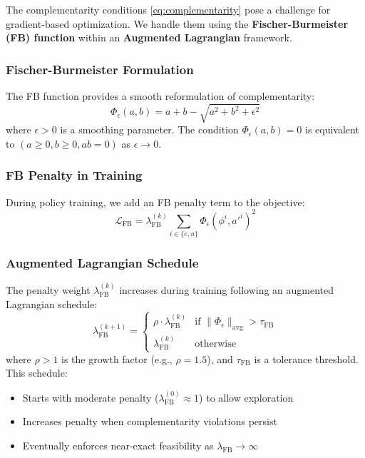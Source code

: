 The complementarity conditions \eqref{eq:complementarity} pose a challenge for gradient-based optimization. We handle them using the \textbf{Fischer-Burmeister (FB) function} within an \textbf{Augmented Lagrangian} framework.

\subsubsection{Fischer-Burmeister Formulation}
The FB function provides a smooth reformulation of complementarity:
\begin{equation}\label{eq:fb_function}
    \Phi_\epsilon(a, b) = a + b - \sqrt{a^2 + b^2 + \epsilon^2}
\end{equation}
where $\epsilon > 0$ is a smoothing parameter. The condition $\Phi_\epsilon(a, b) = 0$ is equivalent to $(a \geq 0, b \geq 0, ab = 0)$ as $\epsilon \to 0$.

\subsubsection{FB Penalty in Training}
During policy training, we add an FB penalty term to the objective:
\begin{equation}\label{eq:fb_penalty}
    \mathcal{L}_{\text{FB}} = \lambda_{\text{FB}}^{(k)} \sum_{i \in \{e, u\}} \Phi_\epsilon(\phi^i, a'^i)^2
\end{equation}

\subsubsection{Augmented Lagrangian Schedule}
The penalty weight $\lambda_{\text{FB}}^{(k)}$ increases during training following an augmented Lagrangian schedule:
\begin{equation}
    \lambda_{\text{FB}}^{(k+1)} = \begin{cases}
        \rho \cdot \lambda_{\text{FB}}^{(k)} & \text{if } \|\Phi_\epsilon\|_{\text{avg}} > \tau_{\text{FB}} \\
        \lambda_{\text{FB}}^{(k)} & \text{otherwise}
    \end{cases}
\end{equation}
where $\rho > 1$ is the growth factor (e.g., $\rho = 1.5$), and $\tau_{\text{FB}}$ is a tolerance threshold. This schedule:
\begin{itemize}
    \item Starts with moderate penalty ($\lambda_{\text{FB}}^{(0)} \approx 1$) to allow exploration
    \item Increases penalty when complementarity violations persist
    \item Eventually enforces near-exact feasibility as $\lambda_{\text{FB}} \to \infty$
\end{itemize}

